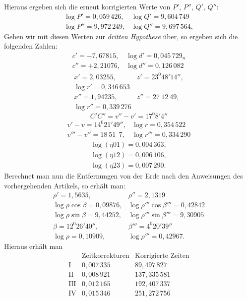 Hieraus ergeben sich die erneut korrigierten Werte von $P'$, $P''$, $Q'$, $Q''$:
\[
\begin{array}{ll}
\log P' = 0{,}059\,426, & \log Q' = 9{,}604\,749 \\
\log P'' = 9{,}972\,249, & \log Q'' = 9{,}697\,564,
\end{array}
\]
Gehen wir mit diesen Werten zur \emph{dritten Hypothese} über, so ergeben sich
die folgenden Zahlen:
\[
\begin{array}{ll}
c' = -7{,}67815, & \log d' = 0{,}045\,729_n \\
c'' = +2{,}21076, & \log d'' = 0{,}126\,082
\end{array}
\]
\[
\begin{array}{ll}
x' = 2{,}03255, & z' = 23^{0}48'14'',\\
\log r' = 0{,}346\,653 & \\
x'' = 1{,}94235, & z'' = 27\ 12\ 49,\\
\log r'' = 0{,}339\,276 & 
\end{array}
\]
\[
C'C'' = v''-v' = 17^{0}8'4''
\]
\[
\begin{array}{ll}
v'-v = 14^{0}21'49'', & \log r = 0{,}354\,522 \\
v'''-v'' = 18\ 51\ \ 7, & \log r''' = 0{,}334\,290
\end{array}
\]
\[
\begin{gathered}
\log(\eta 01) = 0{,}004\,363, \\ \log(\eta 12) = 0{,}006\,106, \\ \log(\eta 23) = 0{,}007\,290.
\end{gathered}
\]
Berechnet man nun die Entfernungen von der Erde nach den Anweisungen des vorhergehenden Artikels,
so erhält man:
\[
\begin{array}{ll}
\rho' = 1{,}5635, & \rho'' = 2{,}1319 \\
\log \rho \cos\beta = 0{,}09876, & \log \rho'''\cos\beta''' = 0{,}42842 \\
\log \rho \sin\beta = 9{,}44252, & \log \rho'''\sin\beta''' = 9{,}30905 \\
\beta = 12^{0}26'40'', & \beta''' = 4^{0}20'39'' \\
\log \rho = 0{,}10909, & \log \rho''' = 0{,}42967.
\end{array}
\]
Hieraus erhält man
\[
\begin{array}{c|c|c}
 & \text{Zeitkorrekturen} & \text{Korrigierte Zeiten} \\
\hline
\text{I} & 0{,}007\,335 & 89{,}497\,827 \\
\text{II} & 0{,}008\,921 & 137{,}335\,581 \\
\text{III} & 0{,}012\,165 & 192{,}407\,337 \\
\text{IV} & 0{,}015\,346 & 251{,}272\,756
\end{array}
\]
